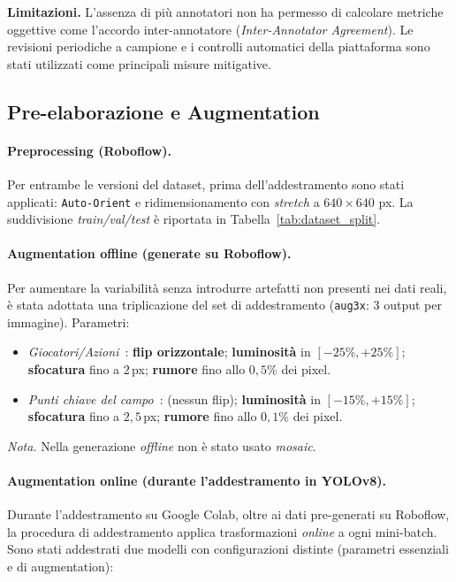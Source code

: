 \documentclass[12pt,a4paper,openright,twoside]{book}
\begin{document}
\smallskip
\noindent\textbf{Limitazioni.} L'assenza di più annotatori non ha 
permesso di calcolare metriche oggettive come l'accordo inter-annotatore 
(\emph{Inter-Annotator Agreement}). Le revisioni periodiche a campione e i 
controlli automatici della piattaforma sono stati utilizzati come 
principali misure mitigative.

\subsection{Pre-elaborazione e Augmentation}
\label{subsec:augmentation}

\paragraph{Preprocessing (Roboflow).}
Per entrambe le versioni del dataset, prima dell'addestramento sono
stati applicati: \texttt{Auto-Orient} e ridimensionamento con
\emph{stretch} a $640{\times}640$ px. La suddivisione \emph{train/val/test}
è riportata in Tabella~\ref{tab:dataset_split}.

\paragraph{Augmentation offline (generate su Roboflow).}
Per aumentare la variabilità senza introdurre artefatti non presenti
nei dati reali, è stata adottata una triplicazione del set di
addestramento (\texttt{aug3x}: 3 output per immagine). Parametri:
\begin{itemize}
  \item \emph{Giocatori/Azioni}~\cite{Basketball-Player-Detection-2-68vvt_Dataset}:
  \textbf{flip orizzontale}; \textbf{luminosità} in $[-25\%, +25\%]$;
  \textbf{sfocatura} fino a $2$\,px; \textbf{rumore} fino allo $0{,}5\%$
  dei pixel.
  \item \emph{Punti chiave del campo}~\cite{Basketball-Court-Detection-2-Ny1gt_Dataset}:
  (nessun flip); \textbf{luminosità} in $[-15\%, +15\%]$;
  \textbf{sfocatura} fino a $2{,}5$\,px; \textbf{rumore} fino allo
  $0{,}1\%$ dei pixel.
\end{itemize}
\emph{Nota.} Nella generazione \emph{offline} non è stato usato
\emph{mosaic}.

\paragraph{Augmentation online (durante l'addestramento in YOLOv8).}
Durante l'addestramento su Google Colab, oltre ai dati pre-generati su
Roboflow, la procedura di addestramento applica trasformazioni
\emph{online} a ogni mini-batch. Sono stati addestrati due modelli con
configurazioni distinte (parametri essenziali e di augmentation):
\end{document}
